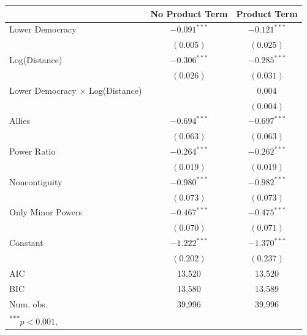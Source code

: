 \documentclass[12pt]{article}
\begin{document}
\begin{appendix}
\begin{table}[H]
\begin{center}
\begin{footnotesize}
\begin{tabular}{l c c }
\hline
                                       & No Product Term & Product Term \\
\hline
Lower Democracy                        & $-0.091^{***}$ & $-0.121^{***}$ \\
                                       & $(0.005)$      & $(0.025)$      \\
Log(Distance)                          & $-0.306^{***}$ & $-0.285^{***}$ \\
                                       & $(0.026)$      & $(0.031)$      \\
Lower Democracy $\times$ Log(Distance) &                & $0.004$        \\
                                       &                & $(0.004)$      \\
Allies                                 & $-0.694^{***}$ & $-0.697^{***}$ \\
                                       & $(0.063)$      & $(0.063)$      \\
Power Ratio                            & $-0.264^{***}$ & $-0.262^{***}$ \\
                                       & $(0.019)$      & $(0.019)$      \\
Noncontiguity                          & $-0.980^{***}$ & $-0.982^{***}$ \\
                                       & $(0.073)$      & $(0.073)$      \\
Only Minor Powers                      & $-0.467^{***}$ & $-0.475^{***}$ \\
                                       & $(0.070)$      & $(0.071)$      \\
Constant                               & $-1.222^{***}$ & $-1.370^{***}$ \\
                                       & $(0.202)$      & $(0.237)$      \\
\hline
AIC                                    & 13,520      & 13,520      \\
BIC                                    & 13,580      & 13,589      \\
Num. obs.                              & 39,996          & 39,996          \\
\hline
\multicolumn{3}{l}{\scriptsize{\textsuperscript{***}$p<0.001$, 
}}
\end{tabular}
\end{footnotesize}
\end{center}
\end{table}
\end{appendix}
\end{document}
